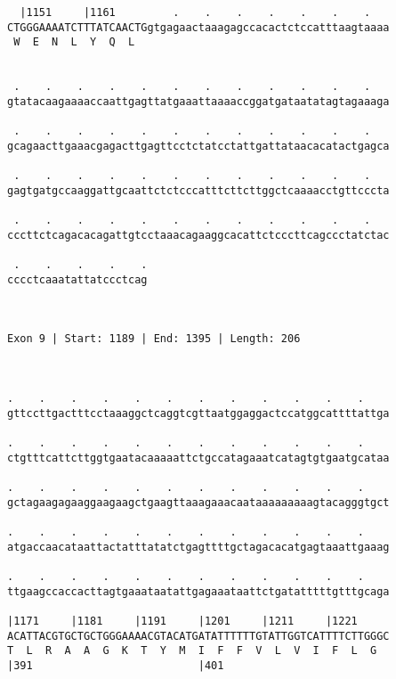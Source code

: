 \documentclass{article}
\begin{document}
\begin{Verbatim}
  |1151     |1161         .    .    .    .    .    .    .   
CTGGGAAAATCTTTATCAACTGgtgagaactaaagagccacactctccatttaagtaaaa
 W  E  N  L  Y  Q  L                                        
                                                            
  
 .    .    .    .    .    .    .    .    .    .    .    .   
gtatacaagaaaaccaattgagttatgaaattaaaaccggatgataatatagtagaaaga
                                                            
 .    .    .    .    .    .    .    .    .    .    .    .   
gcagaacttgaaacgagacttgagttcctctatcctattgattataacacatactgagca
                                                            
 .    .    .    .    .    .    .    .    .    .    .    .   
gagtgatgccaaggattgcaattctctcccatttcttcttggctcaaaacctgttcccta
                                                            
 .    .    .    .    .    .    .    .    .    .    .    .   
cccttctcagacacagattgtcctaaacagaaggcacattctcccttcagccctatctac
                                                            
 .    .    .    .    .
cccctcaaatattatccctcag
                      
                      
 
Exon 9 | Start: 1189 | End: 1395 | Length: 206



.    .    .    .    .    .    .    .    .    .    .    .    
gttccttgactttcctaaaggctcaggtcgttaatggaggactccatggcattttattga
                                                            
.    .    .    .    .    .    .    .    .    .    .    .    
ctgtttcattcttggtgaatacaaaaattctgccatagaaatcatagtgtgaatgcataa
                                                            
.    .    .    .    .    .    .    .    .    .    .    .    
gctagaagagaaggaagaagctgaagttaaagaaacaataaaaaaaaagtacagggtgct
                                                            
.    .    .    .    .    .    .    .    .    .    .    .    
atgaccaacataattactatttatatctgagttttgctagacacatgagtaaattgaaag
                                                            
.    .    .    .    .    .    .    .    .    .    .    .    
ttgaagccaccacttagtgaaataatattgagaaataattctgatatttttgtttgcaga
                                                            
|1171     |1181     |1191     |1201     |1211     |1221     
ACATTACGTGCTGCTGGGAAAACGTACATGATATTTTTTGTATTGGTCATTTTCTTGGGC
T  L  R  A  A  G  K  T  Y  M  I  F  F  V  L  V  I  F  L  G  
|391                          |401                          
  

\end{Verbatim}
\end{document}
